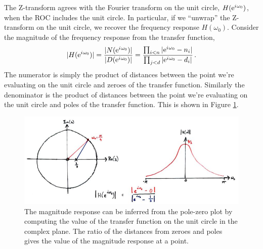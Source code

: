 The Z-transform agrees with the Fourier transform on the unit circle,
$H(\mathrm{e}^{{i\mkern1mu}\omega_0})$, when the ROC includes the unit circle. In particular,
if we ``unwrap'' the Z-transform on the unit circle, we recover the
frequency response $H(\omega_0)$. Consider the magnitude of the frequency
response from the transfer function,
%
\begin{displaymath}
  |H(\mathrm{e}^{{i\mkern1mu}\omega_0})| = \frac{|N(\mathrm{e}^{{i\mkern1mu}\omega_0})|}{|D(\mathrm{e}^{{i\mkern1mu}\omega_0})|}
  = \frac{\prod_{i<n}|\mathrm{e}^{{i\mkern1mu}\omega_0}-n_i|}{\prod_{j<d}|\mathrm{e}^{{i\mkern1mu}\omega_0}-d_i|} \,.
\end{displaymath}
%
The numerator is simply the product of distances between the point we're
evaluating on the unit circle and zeroes of the transfer function. Similarly
the denominator is the product of distances between the point we're
evaluating on the unit circle and poles of the transfer function. This is
shown in Figure \ref{fig::lecture_9_poles_zeroes}.
%
\begin{figure}[!htb]
  \includegraphics[width=\textwidth]{images/lecture_9_poles_zeroes.JPG}
  \caption{
    The magnitude response can be inferred from the pole-zero plot by
    computing the value of the transfer function on the unit circle in the
    complex plane. The ratio of the distances from zeroes and poles gives
    the value of the magnitude response at a point.
  }
  \label{fig::lecture_9_poles_zeroes}
\end{figure}
%
